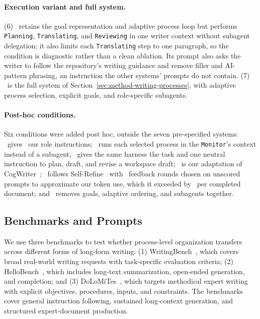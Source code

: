 \paragraph{Execution variant and full system.}
(6) \condSingleWriter\ retains the goal representation and adaptive process loop but performs \texttt{Planning}, \texttt{Translating}, and \texttt{Reviewing} in one writer context without subagent delegation; it also limits each \texttt{Translating} step to one paragraph, so the condition is diagnostic rather than a clean ablation.
Its prompt also asks the writer to follow the repository's writing guidance and remove filler and AI-pattern phrasing, an instruction the other systems' prompts do not contain.
(7) \condAgenticCogWriter\ is the full system of Section~\ref{sec:method-writing-processes}, with adaptive process selection, explicit goals, and role-specific subagents.

\paragraph{Post-hoc conditions.}
Six conditions were added post hoc, outside the seven pre-specified systems.
\condStagedRoles\ gives \condStaged\ our role instructions; \condSingleContext\ runs each selected process in the \texttt{Monitor}'s context instead of a subagent; \condPlainAgent\ gives the same harness the task and one neutral instruction to plan, draft, and revise a workspace draft; \condExploratoryOne\ is our adaptation of CogWriter~\citep{wan2025cognitive}; \condSelfRefine\ follows Self-Refine~\citep{madaan2023self} with \SelfRefineRounds\ feedback rounds chosen on unscored prompts to approximate our token use, which it exceeded by \SelfRefineTokenExcess\ per completed document; and \condLoopOnly\ removes goals, adaptive ordering, and subagents together.



\subsection{Benchmarks and Prompts}
\label{sec:benchmarks}

We use three benchmarks to test whether process-level organization transfers across different forms of long-form writing: (1) WritingBench~\citep{wu2026writingbench}, which covers broad real-world writing requests with task-specific evaluation criteria; (2) HelloBench~\citep{que2024hellobench}, which includes long-text summarization, open-ended generation, and completion; and (3) DoLoMiTes~\citep{malaviya2025dolomites}, which targets methodical expert writing with explicit objectives, procedures, inputs, and constraints.
The benchmarks cover general instruction following, sustained long-context generation, and structured expert-document production.

